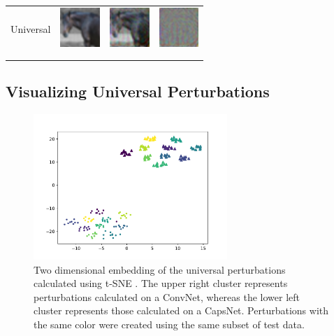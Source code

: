 \documentclass{article}
\begin{document}
\begin{table}[h]
\begin{tabular}{rlll}
		\\
		Universal & \includegraphics[height=1.5cm, align=c]{figures/universal_orig.pdf} & \includegraphics[height=1.5cm, align=c]{figures/universal_adversarial.pdf} & \includegraphics[height=1.5cm, align=c]{figures/universal_diff.pdf}\\
		\\
		\vspace{0.1cm}\\
	\end{tabular}
	\label{tab:images}
\end{table}


\subsection{Visualizing Universal Perturbations}

\begin{figure}[h]
	\centering
	\includegraphics[height=5.5cm]{figures/tsne.pdf}
	\caption{Two dimensional embedding of the universal perturbations calculated using t-SNE \cite{tsne}. The upper right cluster represents perturbations calculated on a ConvNet, whereas the lower left cluster represents those calculated on a CapsNet. Perturbations with the same color were created using the same subset of test data.}
	\label{fig:tsne}
\end{figure}
\end{document}
